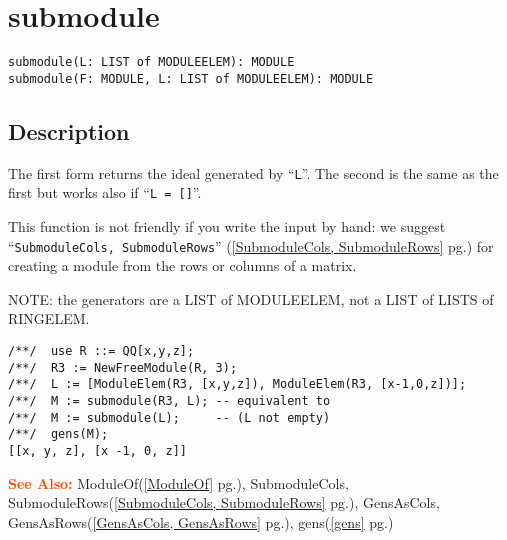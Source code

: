 \documentclass[a4paper]{mybook}
\newenvironment{command}{}{} %
\newcommand\SeeAlso{\par\textcolor{OrangeRed}{\textbf{\large See Also: }}}
\begin{document}
\section{submodule}
\label{submodule}
\begin{command} %


\begin{Verbatim}[label=syntax, rulecolor=\color{MidnightBlue},
frame=single]
submodule(L: LIST of MODULEELEM): MODULE
submodule(F: MODULE, L: LIST of MODULEELEM): MODULE
\end{Verbatim}


\subsection*{Description}

The first form returns the ideal generated by ``\verb&L&''.
The second is the same as the first but works also if ``\verb&L = []&''.
\par 
This function is not friendly if you write the input by hand:
we suggest ``\verb&SubmoduleCols, SubmoduleRows&'' (\ref{SubmoduleCols, SubmoduleRows} pg.\pageref{SubmoduleCols, SubmoduleRows}) for creating
a module from the rows or columns of a matrix.
\par 
NOTE: the generators are a LIST of MODULEELEM, not a LIST of LISTS
of RINGELEM.
\begin{Verbatim}[label=example, rulecolor=\color{PineGreen}, frame=single]
/**/  use R ::= QQ[x,y,z];
/**/  R3 := NewFreeModule(R, 3);
/**/  L := [ModuleElem(R3, [x,y,z]), ModuleElem(R3, [x-1,0,z])];
/**/  M := submodule(R3, L); -- equivalent to
/**/  M := submodule(L);     -- (L not empty)
/**/  gens(M);
[[x, y, z], [x -1, 0, z]]
\end{Verbatim}


\SeeAlso %
  ModuleOf(\ref{ModuleOf} pg.\pageref{ModuleOf}), 
    SubmoduleCols, SubmoduleRows(\ref{SubmoduleCols, SubmoduleRows} pg.\pageref{SubmoduleCols, SubmoduleRows}), 
    GensAsCols, GensAsRows(\ref{GensAsCols, GensAsRows} pg.\pageref{GensAsCols, GensAsRows}), 
    gens(\ref{gens} pg.\pageref{gens})
\end{command} %
\end{document}
